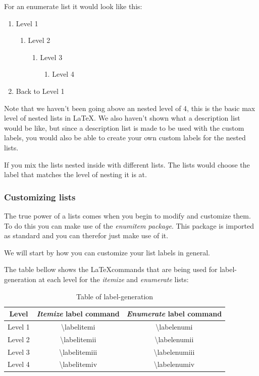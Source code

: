 \documentclass{article}
\newcommand{\bs}[1]{\textbackslash{}#1} %
\begin{document}
For an enumerate list it would look like this:
\begin{enumerate}
    \item Level 1
    \begin{enumerate}
        \item Level 2
        \begin{enumerate}
            \item Level 3
            \begin{enumerate}
                \item Level 4
            \end{enumerate}
        \end{enumerate}
    \end{enumerate}
    \item Back to Level 1
\end{enumerate}

Note that we haven't been going above an nested level of 4, this is the basic 
max level of nested lists in \LaTeX.
We also haven't shown what a description list would be like, but since a 
description list is made to be used with the custom labels, you would also 
be able to create your own custom labels for the nested lists. 

If you mix the lists nested inside with different lists. The lists would choose
the label that matches the level of nesting it is at.


\subsubsection{Customizing lists}
The true power of a lists comes when you begin to modify and customize them.
To do this you can make use of the \textit{enumitem package}. This package is
imported as standard and you can therefor just make use of it.

We will start by how you can customize your list labels in general.

The table bellow shows the \LaTeX commands that are being used for label-generation
at each level for the \textit{itemize} and \textit{enumerate} lists:
\begin{table}[H]
    \centering
    \begin{tabular}{|c|c|c|} \hline
        \rowcolor{gray!30}
        Level & \textit{Itemize} label command & \textit{Enumerate} label command \\ \hline
        Level 1 & \bs{labelitemi} & \bs{labelenumi} \\ \hline
        Level 2 & \bs{labelitemii} & \bs{labelenumii} \\ \hline
        Level 3 & \bs{labelitemiii} & \bs{labelenumiii} \\ \hline
        Level 4 & \bs{labelitemiv} & \bs{labelenumiv} \\ \hline
    \end{tabular}
    \caption{Table of label-generation}
\end{table}
\end{document}
